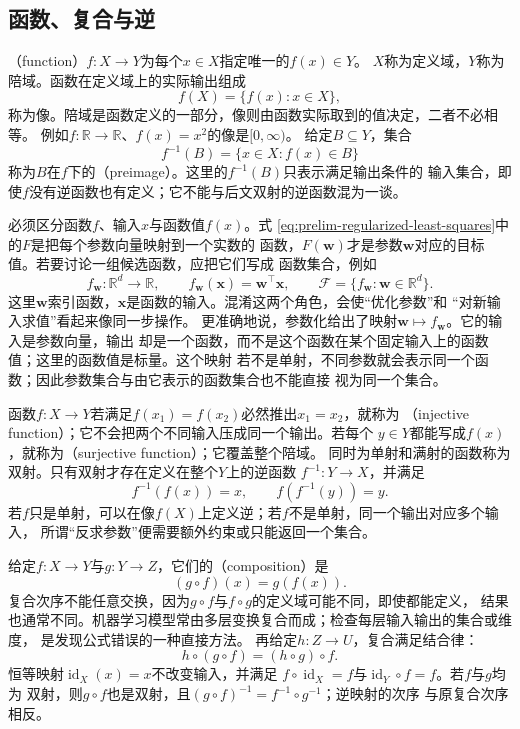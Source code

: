 \subsection{函数、复合与逆}

（function）$f:X\to Y$为每个$x\in X$指定唯一的$f(x)\in Y$。
$X$称为定义域，$Y$称为陪域。函数在定义域上的实际输出组成
\[
  f(X)=\{f(x):x\in X\},
\]
称为像。陪域是函数定义的一部分，像则由函数实际取到的值决定，二者不必相等。
例如$f:\mathbb{R}\to\mathbb{R}$、$f(x)=x^2$的像是$[0,\infty)$。
给定$B\subseteq Y$，集合
\[
  f^{-1}(B)=\{x\in X:f(x)\in B\}
\]
称为$B$在$f$下的（preimage）。这里的$f^{-1}(B)$只表示满足输出条件的
输入集合，即使$f$没有逆函数也有定义；它不能与后文双射的逆函数混为一谈。

必须区分函数$f$、输入$x$与函数值$f(x)$。式
\eqref{eq:prelim-regularized-least-squares}中的$F$是把每个参数向量映射到一个实数的
函数，$F(\bm{w})$才是参数$\bm{w}$对应的目标值。若要讨论一组候选函数，应把它们写成
函数集合，例如
\[
  f_{\bm{w}}:\mathbb{R}^d\to\mathbb{R},
  \qquad
  f_{\bm{w}}(\bm{x})=\bm{w}^{\top}\bm{x},
  \qquad
  \mathcal{F}=\{f_{\bm{w}}:\bm{w}\in\mathbb{R}^d\}.
\]
这里$\bm{w}$索引函数，$\bm{x}$是函数的输入。混淆这两个角色，会使“优化参数”和
“对新输入求值”看起来像同一步操作。
更准确地说，参数化给出了映射$\bm{w}\mapsto f_{\bm{w}}$。它的输入是参数向量，输出
却是一个函数，而不是这个函数在某个固定输入上的函数值；这里的函数值是标量。这个映射
若不是单射，不同参数就会表示同一个函数；因此参数集合与由它表示的函数集合也不能直接
视为同一个集合。

函数$f:X\to Y$若满足$f(x_1)=f(x_2)$必然推出$x_1=x_2$，就称为
（injective function）；它不会把两个不同输入压成同一个输出。若每个
$y\in Y$都能写成$f(x)$，就称为（surjective function）；它覆盖整个陪域。
同时为单射和满射的函数称为双射。只有双射才存在定义在整个$Y$上的逆函数
$f^{-1}:Y\to X$，并满足
\[
  f^{-1}(f(x))=x,\qquad f(f^{-1}(y))=y.
\]
若$f$只是单射，可以在像$f(X)$上定义逆；若$f$不是单射，同一个输出对应多个输入，
所谓“反求参数”便需要额外约束或只能返回一个集合。

给定$f:X\to Y$与$g:Y\to Z$，它们的（composition）是
\[
  (g\circ f)(x)=g(f(x)).
\]
复合次序不能任意交换，因为$g\circ f$与$f\circ g$的定义域可能不同，即使都能定义，
结果也通常不同。机器学习模型常由多层变换复合而成；检查每层输入输出的集合或维度，
是发现公式错误的一种直接方法。
再给定$h:Z\to U$，复合满足结合律：
\[
  h\circ(g\circ f)=(h\circ g)\circ f.
\]
恒等映射$\operatorname{id}_X(x)=x$不改变输入，并满足
$f\circ\operatorname{id}_X=f$与$\operatorname{id}_Y\circ f=f$。若$f$与$g$均为
双射，则$g\circ f$也是双射，且$(g\circ f)^{-1}=f^{-1}\circ g^{-1}$；逆映射的次序
与原复合次序相反。

